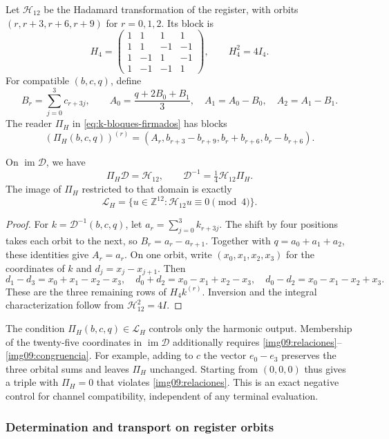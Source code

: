 Let $\mathcal H_{12}$ be the Hadamard transformation of the register,
with orbits $(r,r+3,r+6,r+9)$ for $r=0,1,2$. Its block is
\[
 H_4=\begin{pmatrix}
 1&1&1&1\\1&1&-1&-1\\1&-1&1&-1\\1&-1&-1&1
 \end{pmatrix},\qquad H_4^2=4I_4.
\]
For compatible $(b,c,q)$, define
\[
 B_r=\sum_{j=0}^3c_{r+3j},\qquad
 A_0=\frac{q+2B_0+B_1}{3},\quad A_1=A_0-B_0,
 \quad A_2=A_1-B_1.
\]
The reader $\Pi_H$ in \eqref{eq:k-bloques-firmados} has blocks
\[
 (\Pi_H(b,c,q))^{(r)}=
 (A_r,b_{r+3}-b_{r+9},b_r+b_{r+6},b_r-b_{r+6}).
\]

\begin{proposition}
\label{img09:triangulo}
On $\operatorname{im}\mathcal D$, we have
\[
 \Pi_H\mathcal D=\mathcal H_{12},\qquad
 \mathcal D^{-1}=\tfrac14\mathcal H_{12}\Pi_H.
\]
The image of $\Pi_H$ restricted to that domain is exactly
\[
 \mathcal L_H=
 \{u\in\mathbb Z^{12}:\mathcal H_{12}u\equiv0\pmod4\}.
\]
\end{proposition}
\begin{proof}
For $k=\mathcal D^{-1}(b,c,q)$, let
$a_r=\sum_{j=0}^3k_{r+3j}$. The shift by four positions
takes each orbit to the next, so $B_r=a_r-a_{r+1}$.
Together with $q=a_0+a_1+a_2$, these identities give $A_r=a_r$.
On one orbit, write $(x_0,x_1,x_2,x_3)$ for the coordinates
of $k$ and $d_j=x_j-x_{j+1}$. Then
\[
 d_1-d_3=x_0+x_1-x_2-x_3,\quad
 d_0+d_2=x_0-x_1+x_2-x_3,\quad
 d_0-d_2=x_0-x_1-x_2+x_3.
\]
These are the three remaining rows of $H_4k^{(r)}$. Inversion and the
integral characterization follow from $\mathcal H_{12}^2=4I$.
\end{proof}

The condition $\Pi_H(b,c,q)\in\mathcal L_H$ controls only the
harmonic output. Membership of the twenty-five coordinates in
$\operatorname{im}\mathcal D$ additionally requires
\eqref{img09:relaciones}--\eqref{img09:congruencia}.
For example, adding to $c$ the vector $e_0-e_3$ preserves the three orbital
sums and leaves $\Pi_H$ unchanged. Starting from $(0,0,0)$ thus
gives a triple with $\Pi_H=0$ that violates
\eqref{img09:relaciones}. This is an exact negative control for
channel compatibility, independent of any terminal evaluation.

\subsubsection{Determination and transport on register orbits}

